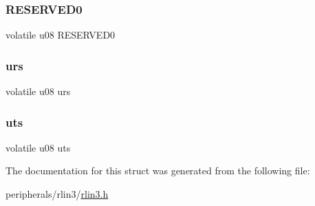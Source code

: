 \subsubsection{\texorpdfstring{R\+E\+S\+E\+R\+V\+E\+D0}{RESERVED0}}
{\footnotesize\ttfamily volatile u08 R\+E\+S\+E\+R\+V\+E\+D0}

\mbox{\label{structrlin3__lst__bit_a530b27a56cb2bacad1c64882037bab6d}} 
\subsubsection{\texorpdfstring{urs}{urs}}
{\footnotesize\ttfamily volatile u08 urs}

\mbox{\label{structrlin3__lst__bit_a3f5f7e9f7fa316f196a301d5a6002e42}} 
\subsubsection{\texorpdfstring{uts}{uts}}
{\footnotesize\ttfamily volatile u08 uts}



The documentation for this struct was generated from the following file\+:\begin{DoxyCompactItemize}
\item 
peripherals/rlin3/\mbox{\hyperlink{rlin3_8h}{rlin3.\+h}}\end{DoxyCompactItemize}
